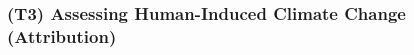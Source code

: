 \documentclass[11pt]{article}
\newcommand\citep{\cite}
\begin{document}



\subsubsection{(T3) Assessing Human-Induced Climate Change (Attribution)}
\end{document}
